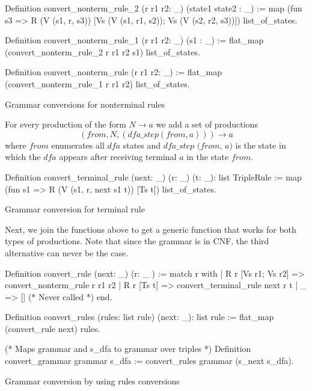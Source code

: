 \begin{listing}[h]
    \begin{pyglist}[language=coq, numbers=none, numbersep=5pt]
  Definition convert_nonterm_rule_2 
    (r r1 r2: _) 
    (state1 state2 : _) :=
    map (fun s3 => R (V (s1, r, s3)) 
                     [Vs (V (s1, r1, s2)); 
                      Vs (V (s2, r2, s3))])
      list_of_states.

  Definition convert_nonterm_rule_1  
               (r r1 r2: _) 
               (s1 : _) :=
    flat_map (convert_nonterm_rule_2 r r1 r2 s1) 
             list_of_states.

  Definition convert_nonterm_rule (r r1 r2: _) :=
    flat_map (convert_nonterm_rule_1 r r1 r2) 
             list_of_states.
    \end{pyglist}
    \caption{Grammar conversions for nonterminal rules}
    \label{lst:verbments1}
\end{listing}

For every production of the form $N \to a$ we add a set of productions $$(\textit{from}, N, (\textit{dfa\_step}(\textit{from}, a))) \to a$$ where $\textit{from}$ enumerates all $\textit{dfa}$ states and $\textit{dfa\_step (from, a)}$ is the state in which the $\textit{dfa}$ appears after receiving terminal $a$ in the state $\textit{from}$.

\begin{listing}[h]
    \begin{pyglist}[language=coq, numbers=none, numbersep=5pt]
  Definition convert_terminal_rule 
              (next: _) 
              (r: _) 
              (t: _): list TripleRule :=
    map (fun s1 => R (V (s1, r, next s1 t)) 
	               [Ts t]) 
        list_of_states.
    \end{pyglist}
    \caption{Grammar conversion for terminal rule}
    \label{lst:verbments1}
\end{listing}

Next, we join the functions above to get a generic function that works for both types of productions. 
Note that since the grammar is in CNF, the third alternative can never be the case.

\begin{listing}[h]
    \begin{pyglist}[language=coq, numbers=none, numbersep=5pt]
  Definition convert_rule (next: _) (r: _ ) :=
    match r with
    | R r [Vs r1; Vs r2] => 
        convert_nonterm_rule r r1 r2
    | R r [Ts t] => 
        convert_terminal_rule next r t 
    | _  => []   (* Never called *)
    end.
        
  Definition convert_rules 
    (rules: list rule) (next: _): list rule :=
    flat_map (convert_rule next) rules.
    
  (* Maps grammar and s_dfa 
     to grammar over triples *)
  Definition convert_grammar grammar s_dfa :=
    convert_rules grammar (s_next s_dfa). 
    \end{pyglist}
    \caption{Grammar conversion by using rules conversions}
    \label{lst:verbments1}
\end{listing}

